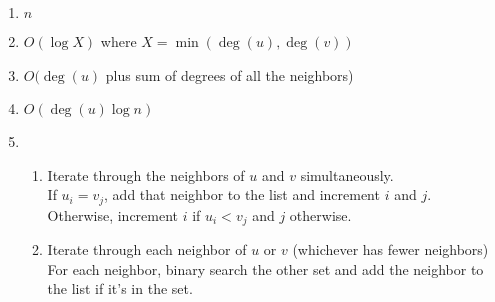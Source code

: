 \documentclass[11pt]{article}
\begin{document}
\begin{enumerate}
    \item $n$
    \item $O(\log{X})$ where $X = \min{(\deg(u), \deg(v))}$
    \item $O(\deg(u)$ plus sum of degrees of all the neighbors)
    \item $O(\deg(u) \log{n})$
    \item 
    \begin{enumerate}
        \item
        Iterate through the neighbors of $u$ and $v$ simultaneously.\\
        If $u_i = v_j$, add that neighbor to the list and increment $i$ and $j$.\\
        Otherwise, increment $i$ if $u_i < v_j$ and $j$ otherwise.
        \item
        Iterate through each neighbor of $u$ or $v$ (whichever has fewer neighbors)\\
        For each neighbor, binary search the other set and add the neighbor to the list if it's in the set.
    \end{enumerate}
\end{enumerate}
\end{document}

